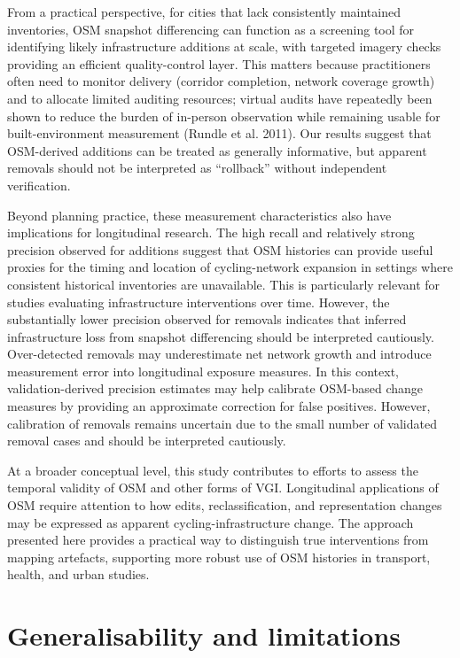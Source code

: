 \documentclass[
]{article}
\begin{document}
From a practical perspective, for cities that lack consistently
maintained inventories, OSM snapshot differencing can function as a
screening tool for identifying likely infrastructure additions at scale,
with targeted imagery checks providing an efficient quality-control
layer. This matters because practitioners often need to monitor delivery
(corridor completion, network coverage growth) and to allocate limited
auditing resources; virtual audits have repeatedly been shown to reduce
the burden of in-person observation while remaining usable for
built-environment measurement (Rundle et al. 2011). Our results suggest
that OSM-derived additions can be treated as generally informative, but
apparent removals should not be interpreted as ``rollback'' without
independent verification.

Beyond planning practice, these measurement characteristics also have
implications for longitudinal research. The high recall and relatively
strong precision observed for additions suggest that OSM histories can
provide useful proxies for the timing and location of cycling-network
expansion in settings where consistent historical inventories are
unavailable. This is particularly relevant for studies evaluating
infrastructure interventions over time. However, the substantially lower
precision observed for removals indicates that inferred infrastructure
loss from snapshot differencing should be interpreted cautiously.
Over-detected removals may underestimate net network growth and
introduce measurement error into longitudinal exposure measures. In this
context, validation-derived precision estimates may help calibrate
OSM-based change measures by providing an approximate correction for
false positives. However, calibration of removals remains uncertain due
to the small number of validated removal cases and should be interpreted
cautiously.

At a broader conceptual level, this study contributes to efforts to
assess the temporal validity of OSM and other forms of VGI. Longitudinal
applications of OSM require attention to how edits, reclassification,
and representation changes may be expressed as apparent
cycling-infrastructure change. The approach presented here provides a
practical way to distinguish true interventions from mapping artefacts,
supporting more robust use of OSM histories in transport, health, and
urban studies.

\section{Generalisability and
limitations}\label{generalisability-and-limitations}
\end{document}
